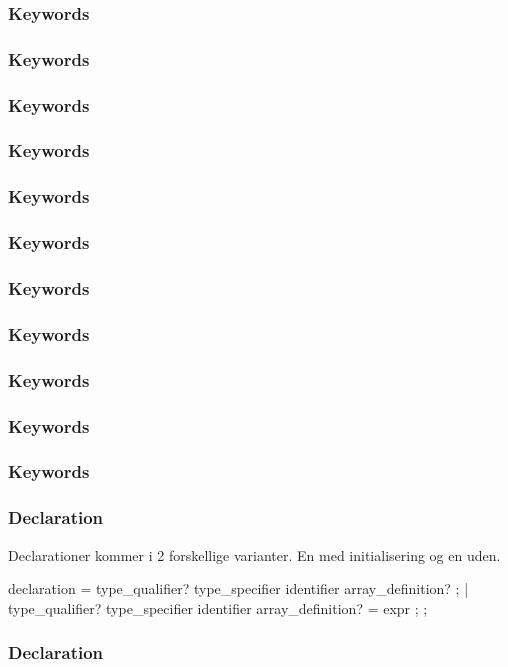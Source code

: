 \subsubsection{Keywords}

\subsubsection{Keywords}

\subsubsection{Keywords}

\subsubsection{Keywords}

\subsubsection{Keywords}

\subsubsection{Keywords}

\subsubsection{Keywords}

\subsubsection{Keywords}

\subsubsection{Keywords}

\subsubsection{Keywords}

\subsubsection{Keywords}




\subsubsection{Declaration}
Declarationer kommer i 2 forskellige varianter. En med initialisering og en uden.

declaration =
	type_qualifier? type_specifier identifier array_definition? ;											
  | type_qualifier? type_specifier identifier array_definition? = expr ;
;


\subsubsection{Declaration}


\subsubsection{}